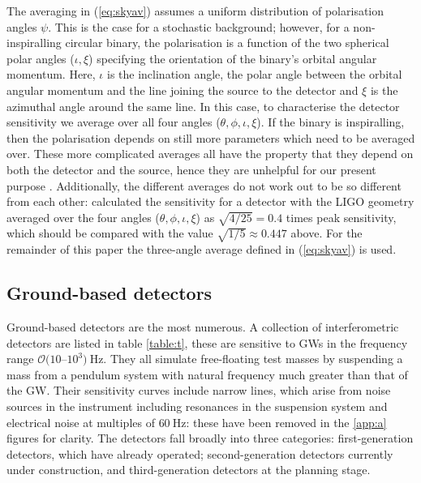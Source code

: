 The averaging in (\ref{eq:skyav}) assumes a uniform distribution of polarisation angles $\psi$. This is the case for a stochastic background; however, for a non-inspiralling circular binary, the polarisation is a function of the two spherical polar angles ($\iota,\xi$) specifying the orientation of the binary's orbital angular momentum. Here, $\iota$ is the inclination angle, the polar angle between the orbital angular momentum and the line joining the source to the detector  and $\xi$ is the azimuthal angle around the same line. In this case, to characterise the detector sensitivity we average over all four angles ($\theta,\phi,\iota,\xi$). If the binary is inspiralling, then the polarisation depends on still more parameters which need to be averaged over. These more complicated averages all have the property that they depend on both the detector and the source, hence they are unhelpful for our present purpose . Additionally, the different averages do not work out to be so different from each other: \citet{1993PhRvD..47.2198F} calculated the sensitivity for a detector with the LIGO geometry averaged over the four angles ($\theta,\phi,\iota,\xi$) as $\sqrt{4/25}=0.4$ times peak sensitivity, which should be compared with the value $\sqrt{1/5}\approx 0.447$ above. For the remainder of this paper the three-angle average defined in (\ref{eq:skyav}) is used.

\subsection{Ground-based detectors}\label{sec:ground}

Ground-based detectors are the most numerous. A collection of interferometric detectors are listed in table \ref{table:t}, these are sensitive to GWs in the frequency range ${\mathcal{O}}(10$--$10^{3})~\mathrm{Hz}$. They all simulate free-floating test masses by suspending a mass from a pendulum system with natural frequency much greater than that of the GW. Their sensitivity curves include narrow lines, which arise from noise sources in the instrument including resonances in the suspension system and electrical noise at multiples of $60~\mathrm{Hz}$: these have been removed in the \ref{app:a} figures for clarity. The detectors fall broadly into three categories: first-generation detectors, which have already operated; second-generation detectors currently under construction, and third-generation detectors at the planning stage. 

